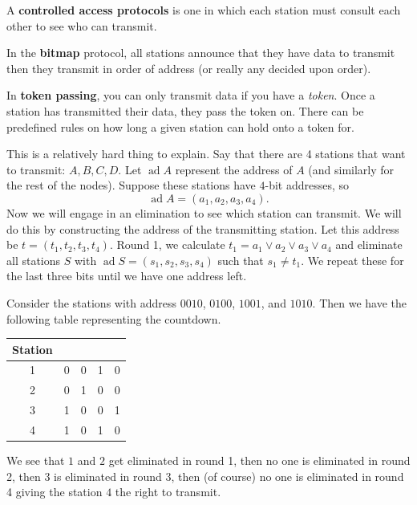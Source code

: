 \begin{definition}
    A \textbf{controlled access protocols} is one in which each station must consult each other to see who can transmit.
\end{definition}

\begin{example}[Bitmap]
    In the \textbf{bitmap} protocol, all stations announce that they have data to transmit then they transmit in order of address (or really any decided upon order).
\end{example}

\begin{example}
    In \textbf{token passing}, you can only transmit data if you have a \emph{token}. Once a station has transmitted their data, they pass the token on. There can be predefined rules on how long a given station can hold onto a token for.
\end{example}

\begin{example}
    This is a relatively hard thing to explain. 
    Say that there are 4 stations that want to transmit: $A, B, C, D$. 
    Let $\operatorname{ad}{A}$ represent the address of $A$ (and similarly for the rest of the nodes). 
    Suppose these stations have $4$-bit addresses, so
    \[ \operatorname{ad}{A} = (a_1, a_2, a_3, a_4). \]
    Now we will engage in an elimination to see which station can transmit. 
    We will do this by constructing the address of the transmitting station.
    Let this address be $t = (t_1, t_2, t_3, t_4)$.
    Round 1, we calculate 
    $t_1 = a_1 \lor a_2 \lor a_3 \lor a_4$ 
    and eliminate all stations $S$ with 
    $\operatorname{ad}{S} = (s_1, s_2, s_3, s_4)$
    such that $s_1 \neq t_1$. We repeat these for the last three bits until we have one address left. 
\end{example}

\begin{example}
    Consider the stations with address $0010$, $0100$, $1001$, and $1010$. Then we have the following table representing the countdown.
    \begin{center}
        \begin{tabular}{ccccc}
            \toprule
            Station & & & & \\
            \midrule
            1 & 0 & 0 & 1 & 0 \\
            2 & 0 & 1 & 0 & 0 \\
            3 & 1 & 0 & 0 & 1 \\
            4 & 1 & 0 & 1 & 0 \\
            \bottomrule
        \end{tabular}
    \end{center}
    We see that $1$ and $2$ get eliminated in round 1, then no one is eliminated in round 2, then $3$ is eliminated in round 3, then (of course) no one is eliminated in round 4 giving the station $4$ the right to transmit.
\end{example}
